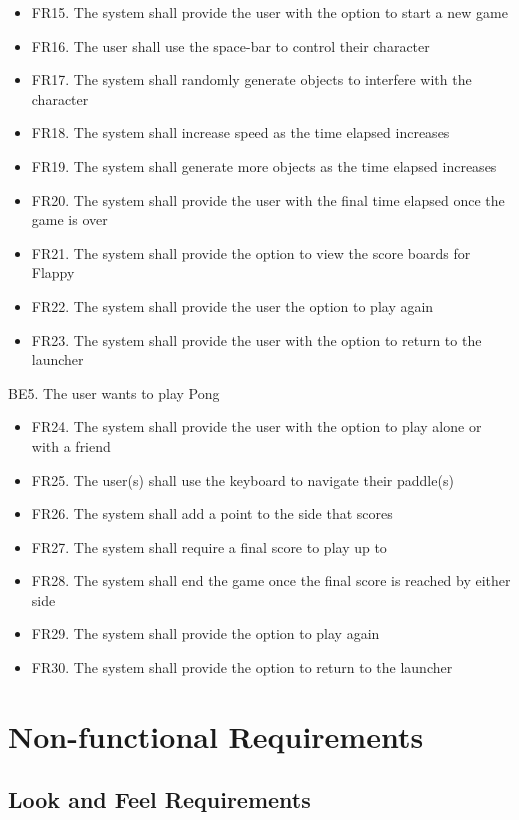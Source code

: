 \documentclass[12pt, titlepage]{article}
\begin{document}
    \begin{itemize}
        \item FR15. The system shall provide the user with the option to start a new game
        \item FR16. The user shall use the space-bar to control their character
        \item FR17. The system shall randomly generate objects to interfere with the character
        \item FR18. The system shall increase speed as the time elapsed increases
        \item FR19. The system shall generate more objects as the time elapsed increases
        \item FR20. The system shall provide the user with the final time elapsed once the game is over
        \item FR21. The system shall provide the option to view the score boards for Flappy
        \item FR22. The system shall provide the user the option to play again
        \item FR23. The system shall provide the user with the option to return to the launcher
    \end{itemize}
    BE5. The user wants to play Pong
    \begin{itemize}
        \item FR24. The system shall provide the user with the option to play alone or with a friend
        \item FR25. The user(s) shall use the keyboard to navigate their paddle(s)
        \item FR26. The system shall add a point to the side that scores
        \item FR27. The system shall require a final score to play up to
        \item FR28. The system shall end the game once the final score is reached by either side
        \item FR29. The system shall provide the option to play again
        \item FR30. The system shall provide the option to return to the launcher
    \end{itemize}


\section{Non-functional Requirements}

\subsection{Look and Feel Requirements}
\end{document}
